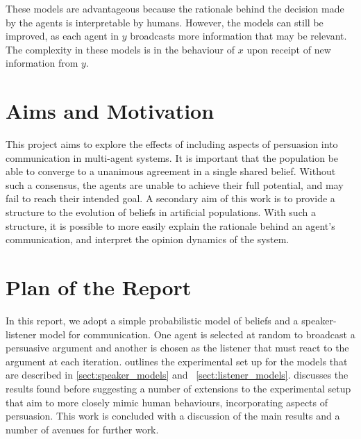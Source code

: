 These models are advantageous because the rationale behind the decision made by the agents is interpretable by humans. However, the models can still be improved, as each agent in $y$ broadcasts more information that may be relevant. The complexity in these models is in the behaviour of $x$ upon receipt of new information from $y$. 

\section{Aims and Motivation}

This project aims to explore the effects of including aspects of persuasion into communication in multi-agent systems. It is important that the population be able to converge to a unanimous agreement in a single shared belief. Without such a consensus, the agents are unable to achieve their full potential, and may fail to reach their intended goal. A secondary aim of this work is to provide a structure to the evolution of beliefs in artificial populations. With such a structure, it is possible to more easily explain the rationale behind an agent's communication, and interpret the opinion dynamics of the system. 


\section{Plan of the Report}

In this report, we adopt a simple probabilistic model of beliefs and a speaker-listener model for communication. One agent is selected at random to broadcast a persuasive argument and another is chosen as the listener that must react to the argument at each iteration.  outlines the experimental set up for the models that are described in \cref{sect:speaker_models} and ~\cref{sect:listener_models}.  discusses the results found before suggesting a number of extensions to the experimental setup that aim to more closely mimic human behaviours, incorporating aspects of persuasion. This work is concluded with a discussion of the main results and a number of avenues for further work. 









